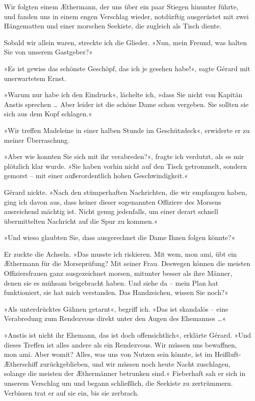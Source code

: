 Wir folgten einem Æthermann, der uns über ein paar Stiegen hinunter
führte, und fanden uns in einem engen Verschlag wieder, notdürftig
ausgerüstet mit zwei Hängematten und einer morschen Seekiste, die
zugleich als Tisch diente.

\bigpar

Sobald wir allein waren, streckte ich die Glieder. »Nun, mein
Freund, was halten Sie von unserem Gastgeber?«

»Es ist gewiss das schönste Geschöpf, das ich je gesehen habe!«,
sagte Gérard mit unerwartetem Ernst.

»Warum nur habe ich den Eindruck«, lächelte ich, »dass Sie nicht
von Kapitän Anstis sprechen \ldots{} Aber leider ist die schöne Dame
schon vergeben. Sie sollten sie sich aus dem Kopf schlagen.«

»Wir treffen Madeleine in einer halben Stunde im Geschützdeck«,
erwiderte er zu meiner Überraschung.

»Aber wie konnten Sie sich mit ihr verabreden?«, fragte ich
verdutzt, als es mir plötzlich klar wurde. »Sie haben vorhin nicht
auf den Tisch getrommelt, sondern gemorst – mit einer
außerordentlich hohen Geschwindigkeit.«

Gérard nickte. »Nach den stümperhaften Nachrichten, die wir
empfangen haben, ging ich davon aus, dass keiner dieser sogenannten
Offiziere des Morsens ausreichend mächtig ist. Nicht genug
jedenfalls, um einer derart schnell übermittelten Nachricht auf die
Spur zu kommen.«

»Und wieso glaubten Sie, dass ausgerechnet die Dame Ihnen folgen
könnte?«

Er zuckte die Achseln. »Das musste ich riskieren. Mit wem, mon ami,
übt ein Æthermann für die Morseprüfung? Mit seiner Frau. Deswegen
können die meisten Offiziersfrauen ganz ausgezeichnet morsen,
mitunter besser als ihre Männer, denen sie es mühsam beigebracht
haben. Und siehe da – mein Plan hat funktioniert, sie hat mich
verstanden. Das Handzeichen, wissen Sie noch?«

»Als unterdrücktes Gähnen getarnt«, begriff ich. »Das ist skandalös
– eine Verabredung zum Rendezvous direkt unter den Augen des
Ehemannes \ldots{}«

»Anstis ist nicht ihr Ehemann, das ist doch offensichtlich«,
erklärte Gérard. »Und dieses Treffen ist alles andere als ein
Rendezvous. Wir müssen uns bewaffnen, mon ami. Aber womit? Alles,
was uns von Nutzen sein könnte, ist im Heißluft-Ætherschiff
zurückgeblieben, und wir müssen noch heute Nacht zuschlagen,
solange die meisten der Æthermänner betrunken sind.« Fieberhaft sah
er sich in unserem Verschlag um und begann schließlich, die
Seekiste zu zertrümmern. Verbissen trat er auf sie ein, bis sie
zerbrach.

